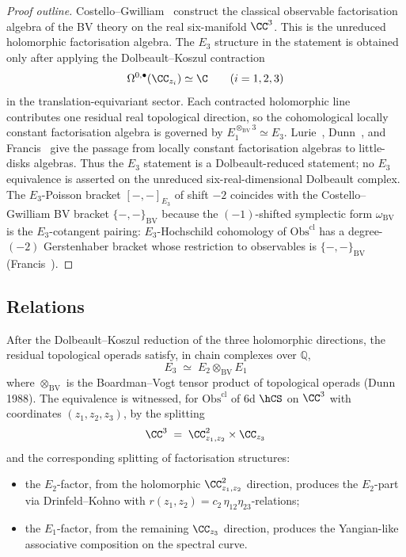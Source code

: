 \begin{proof}[Proof outline]
Costello--Gwilliam~\cite{CG17} construct the classical observable
factorisation algebra of the BV theory on the real six-manifold
\(\CC^3\).  This is the unreduced holomorphic factorisation algebra.
The \(E_3\) structure in the statement is obtained only after applying
the Dolbeault--Koszul contraction
\[
 \Omega^{0,\bullet}(\CC_{z_i}) \simeq \C
 \qquad (i=1,2,3)
\]
in the translation-equivariant sector.  Each contracted holomorphic
line contributes one residual real topological direction, so the
cohomological locally constant factorisation algebra is governed by
\(E_1^{\otimes_{\mathrm{BV}}3}\simeq E_3\).  Lurie~\cite[\S
5.1.2]{HA}, Dunn~\cite{Dunn88}, and Francis~\cite{francis2013tangent}
give the passage from locally constant factorisation algebras to
little-disks algebras.  Thus the \(E_3\) statement is a
Dolbeault-reduced statement; no \(E_3\) equivalence is asserted on the
unreduced six-real-dimensional Dolbeault complex.
The $E_3$-Poisson bracket $[-,-]_{E_3}$ of
shift $-2$ coincides with the
Costello--Gwilliam BV bracket $\{-,-\}_{\mathrm{BV}}$ because the
$(-1)$-shifted symplectic form $\omega_{\mathrm{BV}}$ is the
$E_3$-cotangent pairing: $E_3$-Hochschild cohomology of
$\mathrm{Obs}^{\mathrm{cl}}$ has a degree-$(-2)$ Gerstenhaber bracket
whose restriction to observables is $\{-,-\}_{\mathrm{BV}}$
(Francis~\cite{francis2013tangent}).
\end{proof}

\subsection{Relations}
\label{subsec:E3-relations}

\begin{theorem}
\label{thm:dunn-E3-6d-hCS}
After the Dolbeault--Koszul reduction of the three holomorphic
directions, the residual topological operads satisfy, in chain
complexes over $\mathbb{Q}$,
\[
E_3 \;\simeq\; E_2\otimes_{\mathrm{BV}} E_1
\]
where $\otimes_{\mathrm{BV}}$ is the Boardman--Vogt tensor product
of topological operads (Dunn 1988). The equivalence is witnessed,
for $\mathrm{Obs}^{\mathrm{cl}}$ of 6d $\hCS$ on $\CC^3$ with
coordinates $(z_1,z_2,z_3)$, by the splitting
\[
\CC^3 \;=\; \CC^2_{z_1,z_2} \times \CC_{z_3}
\]
and the corresponding splitting of factorisation structures:
\begin{itemize}
\item the $E_2$-factor, from the holomorphic $\CC^2_{z_1,z_2}$
direction, produces the $E_2$-part via Drinfeld--Kohno with
$r(z_1,z_2) = c_2\,\eta_{12}\eta_{23}$-relations;
\item the $E_1$-factor, from the remaining $\CC_{z_3}$ direction,
produces the Yangian-like associative composition on the spectral
curve.
\end{itemize}
\end{theorem}


